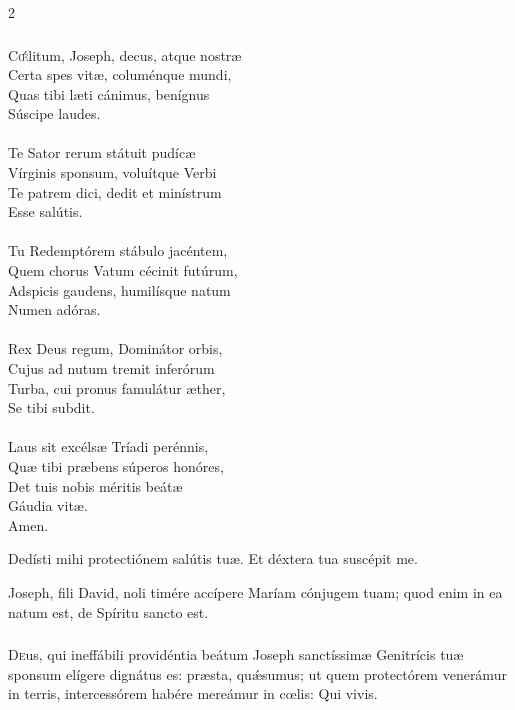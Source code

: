 \documentclass[9pt,twoside]{extarticle}
\begin{document}
\begin{multicols}{2}
\subsubsection*{\center {}}
\lettrine{C}œ́litum, Joseph, decus, atque nostræ\\
Certa spes vitæ, columénque mundi,\\
Quas tibi læti cánimus, benígnus\\
Súscipe laudes.\\
\\
Te Sator rerum státuit pudícæ\\
Vírginis sponsum, voluítque Verbi\\
Te patrem dici, dedit et minístrum\\
Esse salútis.\\
\\
Tu Redemptórem stábulo jacéntem,\\
Quem chorus Vatum cécinit futúrum,\\
Adspicis gaudens, humilísque natum\\
Numen adóras.\\
\\
Rex Deus regum, Dominátor orbis,\\
Cujus ad nutum tremit inferórum\\
Turba, cui pronus famulátur æther,\\
Se tibi subdit.\\
\\
Laus sit excélsæ Tríadi perénnis,\\
Quæ tibi præbens súperos honóres,\\
Det tuis nobis méritis beátæ\\
Gáudia vitæ.\\
Amen.

\begin{tightlist}{}
\item {} Dedísti mihi protectiónem salútis tuæ.  Et déxtera tua suscépit me.
\item {} Joseph, fili David, noli timére accípere Maríam cónjugem tuam; quod enim in ea natum est, de Spíritu sancto est.
\end{tightlist}

\subsubsection*{\center {}}
\lettrine{D}eus, qui ineffábili providéntia beátum Joseph sanctíssimæ Genitrícis tuæ sponsum elígere dignátus es: præsta, quǽsumus; ut quem protectórem venerámur in terris, intercessórem habére mereámur in cœlis: Qui vivis.


\end{multicols}
\end{document}
